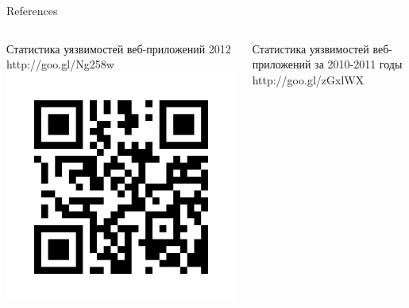 \begin{frame}[fragile]{References}
    \tiny
    \begin{columns}[t] %
         \begin{column}[T]{5cm} %
            \begin{center}
              Статистика уязвимостей \newline веб-приложений 2012 \newline
              http://goo.gl/Ng258w \newline
              \includegraphics[width=\textwidth]{sources/images/report_2012.png}
            \end{center}
         \end{column}
         \begin{column}[T]{5cm} %
            \begin{center}
              Статистика уязвимостей \newline веб-приложений за 2010-2011 годы \newline
              http://goo.gl/zGxlWX \newline

\end{center}
\end{column}
\end{columns}
\end{frame}
